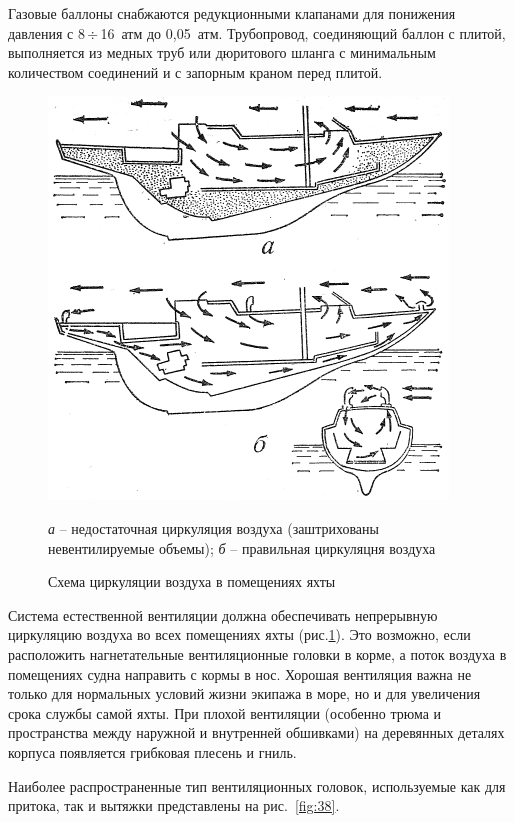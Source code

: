 \documentclass[a4paper, 12pt, twoside, final, book, russian, fittopage, cyremdash]{ncc}
\newcommand{\otdo}{\,\ensuremath{\div}\,}
\newcommand{\ris}[1]{\ref{fig:#1}}
\begin{document}
Газовые баллоны снабжаются редукционными клапанами для понижения давления с 8\otdo 16~атм до 0,05~атм. Трубопровод, соединяющий баллон с плитой, выполняется из медных труб или дюритового шланга с минимальным количеством соединений и с запорным краном перед плитой. 

\begin{figure}[htb]
  \centering
  \includegraphics[scale=1.2]{0037P}
  \caption{Схема циркуляции воздуха в помещениях яхты}
  \label{fig:37}
  \small
  \centering{}
  \textit{а} \--- недостаточная циркуляция воздуха (заштрихованы невентилируемые объемы); \textit{б} \--- правильная циркуляцня воздуха
\end{figure}

Система естественной вентиляции должна обеспечивать непрерывную циркуляцию воздуха во всех помещениях яхты (рис.\ris{37}). Это возможно, если расположить нагнетательные вентиляционные головки в корме, а поток воздуха в помещениях судна направить с кормы в нос. Хорошая вентиляция важна не только для нормальных условий жизни экипажа в море, но и для увеличения срока службы самой яхты. При плохой вентиляции (особенно трюма и пространства между наружной и внутренней обшивками) на деревянных деталях корпуса появляется грибковая плесень и гниль. 

Наиболее распространенные тип вентиляционных головок, используемые как для притока, так и вытяжки представлены на рис.~\ris{38}. 
\end{document}
